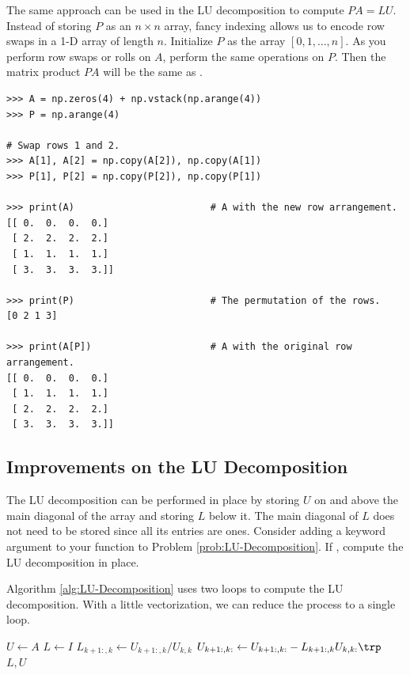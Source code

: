 
The same approach can be used in the LU decomposition to compute $PA = LU$.
Instead of storing $P$ as an $n \times n$ array, fancy indexing allows us to encode row swaps in a 1-D array of length $n$.
Initialize $P$ as the array $[0, 1, \ldots, n]$.
As you perform row swaps or rolls on $A$, perform the same operations on $P$.
Then the matrix product $PA$ will be the same as .

\newpage

\begin{lstlisting}
>>> A = np.zeros(4) + np.vstack(np.arange(4))
>>> P = np.arange(4)

# Swap rows 1 and 2.
>>> A[1], A[2] = np.copy(A[2]), np.copy(A[1])
>>> P[1], P[2] = np.copy(P[2]), np.copy(P[1])

>>> print(A)                        # A with the new row arrangement.
[[ 0.  0.  0.  0.]
 [ 2.  2.  2.  2.]
 [ 1.  1.  1.  1.]
 [ 3.  3.  3.  3.]]

>>> print(P)                        # The permutation of the rows.
[0 2 1 3]

>>> print(A[P])                     # A with the original row arrangement.
[[ 0.  0.  0.  0.]
 [ 1.  1.  1.  1.]
 [ 2.  2.  2.  2.]
 [ 3.  3.  3.  3.]]
\end{lstlisting}

\subsection*{Improvements on the LU Decomposition} %

The LU decomposition can be performed in place by storing $U$ on and above the main diagonal of the array and storing $L$ below it.
The main diagonal of $L$ does not need to be stored since all its entries are ones.
Consider adding a keyword argument  to your function to Problem \ref{prob:LU-Decomposition}.
If , compute the LU decomposition in place.

Algorithm \ref{alg:LU-Decomposition} uses two loops to compute the LU decomposition.
With a little vectorization, we can reduce the process to a single loop.

\begin{algorithm}[H]
\begin{algorithmic}[1]
\State $U \gets A$
\State $L \gets I$
    \State $L_{k+1:,k} \gets U_{k+1:,k}/U_{k,k}$
    \State $U_{k+1:,k:} \gets U_{k+1:,k:} - L_{k+1:,k}U_{k,k:}\trp$
    \label{state:outer-product}
\EndFor
\State {} $L, U$
\EndProcedure
\end{algorithmic}
\caption{}
\end{algorithm}

